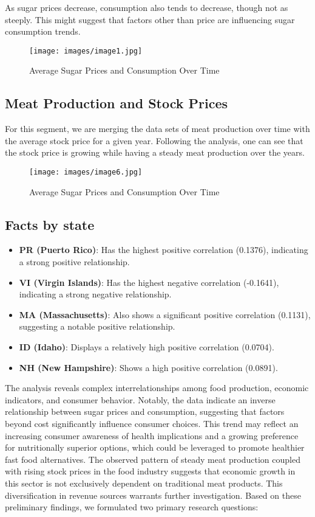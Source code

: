 \documentclass[letterpaper, 11pt]{report}
\begin{document}
As sugar prices decrease, consumption also tends to decrease, though not as steeply. This might suggest that factors other than price are influencing sugar consumption trends.

\begin{figure}[h!]
    \centering
    \texttt{[image: images/image1.jpg]}
    \caption{Average Sugar Prices and Consumption Over Time }
    \label{fig:employees}
\end{figure}


\subsection{Meat Production and Stock Prices}

For this segment, we are merging the data sets of meat production over time with the average stock price for a given year. Following the analysis, one can see that the stock price is growing while having a steady meat production over the years.

\begin{figure}[h!]
    \centering
    \texttt{[image: images/image6.jpg]}
    \caption{Average Sugar Prices and Consumption Over Time }
    \label{fig:employees}
\end{figure}


\subsection*{Facts by state}
\begin{itemize}
    \item \textbf{PR (Puerto Rico)}: Has the highest positive correlation (0.1376), indicating a strong positive relationship.
    \item \textbf{VI (Virgin Islands)}: Has the highest negative correlation (-0.1641), indicating a strong negative relationship.
    \item \textbf{MA (Massachusetts)}: Also shows a significant positive correlation (0.1131), suggesting a notable positive relationship.
    \item \textbf{ID (Idaho)}: Displays a relatively high positive correlation (0.0704).
    \item \textbf{NH (New Hampshire)}: Shows a high positive correlation (0.0891).
\end{itemize}

The analysis reveals complex interrelationships among food production, economic indicators, and consumer behavior. Notably, the data indicate an inverse relationship between sugar prices and consumption, suggesting that factors beyond cost significantly influence consumer choices. This trend may reflect an increasing consumer awareness of health implications and a growing preference for nutritionally superior options, which could be leveraged to promote healthier fast food alternatives.
The observed pattern of steady meat production coupled with rising stock prices in the food industry suggests that economic growth in this sector is not exclusively dependent on traditional meat products. This diversification in revenue sources warrants further investigation.
Based on these preliminary findings, we formulated two primary research questions:
\end{document}
